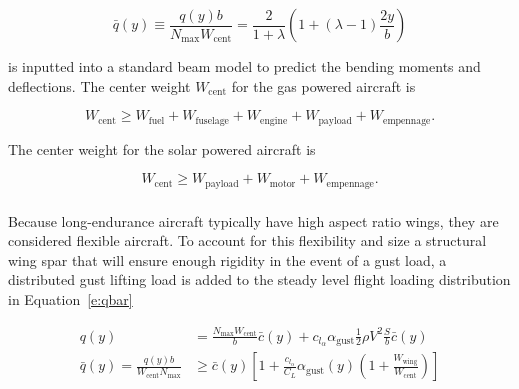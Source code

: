 \begin{equation}
    \label{e:qbar}
    \bar{q}(y) \equiv \frac{q(y)b}{N_{\text{max}}W_{\text{cent}}} = \frac{2}{1+\lambda} \left( 1 + (\lambda - 1) \frac{2y}{b} \right)
\end{equation}

is inputted into a standard beam model to predict the bending moments and deflections. The center weight $W_{\text{cent}}$ for the gas powered aircraft is

\begin{equation}
    W_{\text{cent}} \geq W_{\text{fuel}} + W_{\text{fuselage}} + W_{\text{engine}} + W_{\text{payload}} + W_{\text{empennage}}.
\end{equation}

The center weight for the solar powered aircraft is

\begin{equation}
    W_{\text{cent}} \geq W_{\text{payload}} + W_{\text{motor}} + W_{\text{empennage}}.
\end{equation}


\DIFdelbegin \subsubsection{}
\addtocounter{subsubsection}{-1}%
\DIFdelend \DIFaddbegin \paragraph{\textbf{}} 
\DIFaddend 

Because long-endurance aircraft typically have high aspect ratio wings, they are considered flexible aircraft. 
To account for this flexibility and size a structural wing spar that will ensure enough rigidity in the event of a gust load, a distributed gust lifting load is added to the steady level flight loading distribution in Equation~\eqref{e:qbar}

\begin{align}
    q(y) &= \frac{N_{\text{max}}W_{\text{cent}}}{b}\bar{c}(y) + c_{l_{\alpha}} \alpha_{\text{gust}} \frac{1}{2} \rho V^2 \frac{S}{b}\bar{c}(y) \\
    \bar{q}(y) = \frac{q(y)b}{W_{\text{cent}}N_{\text{max}}} &\geq \bar{c}(y) \left[1 + \frac{c_{l_{\alpha}}}{C_L} \alpha_{\text{gust}} (y) \left(1 + \frac{W_{\text{wing}}}{W_{\text{cent}}} \right) \right]
\end{align}

